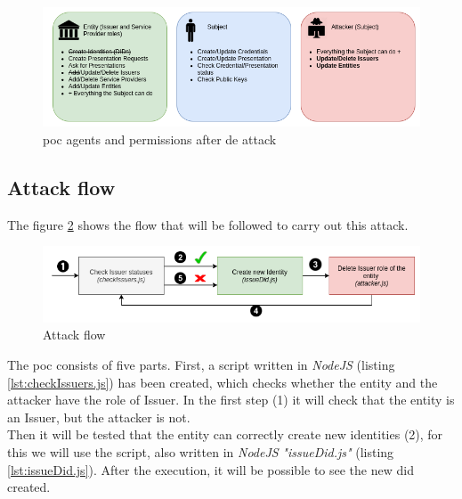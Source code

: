 \documentclass[a4paper, 12pt]{article} %
\begin{document}
        \begin{figure}[h]
            \centering
            \includegraphics[width=1.1\textwidth]{poc-actors-after.png}
            \caption{\acrshort{poc} agents and permissions after de attack}
            \label{fig:poc-actors-after}
        \end{figure}
    
    \subsection{Attack flow}
        The figure \ref{fig:poc-flow} shows the flow that will be followed to carry out this attack.
        \begin{figure}[h]
            \centering
            \includegraphics[width=1.1\textwidth]{poc-flow.png}
            \caption{Attack flow}
            \label{fig:poc-flow}
        \end{figure}
        
        The \acrshort{poc} consists of five parts. First, a script written in \textit{NodeJS} (listing \ref{lst:checkIssuers.js}) has been created, which checks whether the entity and the attacker have the role of Issuer. In the first step (1) it will check that the entity is an Issuer, but the attacker is not.\\
        
        
        Then it will be tested that the entity can correctly create new identities (2), for this we will use the script, also written in \textit{NodeJS} \textit{"issueDid.js"} (listing \ref{lst:issueDid.js}). After the execution, it will be possible to see the new \acrshort{did} created.\\
        
        
\end{document}
